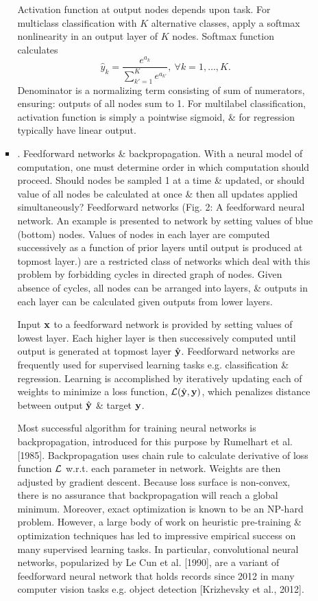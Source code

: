 \documentclass{article}
\begin{document}
\begin{enumerate}
\begin{itemize}
\begin{itemize}
			Activation function at output nodes depends upon task. For multiclass classification with $K$ alternative classes, apply a softmax nonlinearity in an output layer of $K$ nodes. Softmax function calculates
			\begin{equation}
				\hat{y}_k = \frac{e^{a_k}}{\sum_{k'=1}^K e^{a_{k'}}},\ \forall k = 1,\ldots,K.
			\end{equation}
			Denominator is a normalizing term consisting of sum of numerators, ensuring: outputs of all nodes sum to 1. For multilabel classification, activation function is simply a pointwise sigmoid, \& for regression typically have linear output.
			\item {. Feedforward networks \& backpropagation.} With a neural model of computation, one must determine order in which computation should proceed. Should nodes be sampled 1 at a time \& updated, or should value of all nodes be calculated at once \& then all updates applied simultaneously? Feedforward networks ({\sf Fig. 2: A feedforward neural network. An example is presented to network by setting values of blue (bottom) nodes. Values of nodes in each layer are computed successively as a function of prior layers until output is produced at topmost layer.}) are a restricted class of networks which deal with this problem by forbidding cycles in directed graph of nodes. Given absence of cycles, all nodes can be arranged into layers, \& outputs in each layer can be calculated given outputs from lower layers.
			
			Input ${\bf x}$ to a feedforward network is provided by setting values of lowest layer. Each higher layer is then successively computed until output is generated at topmost layer $\hat{\bf y}$. Feedforward networks are frequently used for supervised learning tasks e.g. classification \& regression. Learning is accomplished by iteratively updating each of weights to minimize a loss function, ${\cal L}(\hat{\bf y},{\bf y})$, which penalizes distance between output $\hat{\bf y}$ \& target ${\bf y}$.
			
			Most successful algorithm for training neural networks is backpropagation, introduced for this purpose by Rumelhart et al. [1985]. Backpropagation uses chain rule to calculate derivative of loss function ${\cal L}$ w.r.t. each parameter in network. Weights are then adjusted by gradient descent. Because loss surface is non-convex, there is no assurance that backpropagation will reach a global minimum. Moreover, exact optimization is known to be an NP-hard problem. However, a large body of work on heuristic pre-training \& optimization techniques has led to impressive empirical success on many supervised learning tasks. In particular, convolutional neural networks, popularized by Le Cun et al. [1990], are a variant of feedforward neural network that holds records since 2012 in many computer vision tasks e.g. object detection [Krizhevsky et al., 2012].
			

\end{itemize}
\end{itemize}
\end{enumerate}
\end{document}
